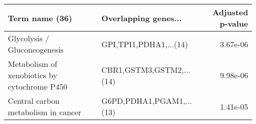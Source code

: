 \begin{tabular}{llr}
\toprule
                              Term name (36) &     Overlapping genes... &  Adjusted p-value \\
\midrule
                Glycolysis / Gluconeogenesis &   GPI,TPI1,PDHA1,...(14) &          3.67e-06 \\
Metabolism of xenobiotics by cytochrome P450 & CBR1,GSTM3,GSTM2,...(14) &          9.98e-06 \\
         Central carbon metabolism in cancer & G6PD,PDHA1,PGAM1,...(13) &          1.41e-05 \\
\bottomrule
\end{tabular}

